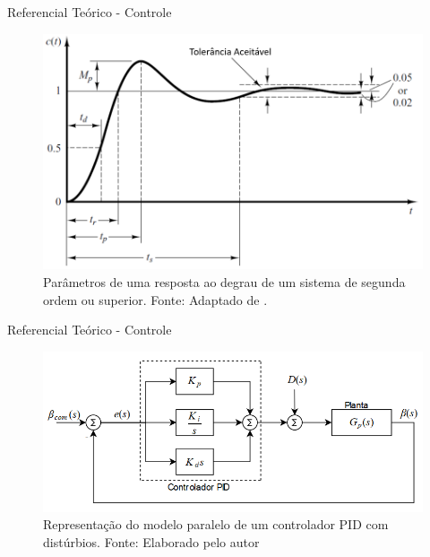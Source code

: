 \documentclass{beamer}
\begin{document}

\begin{frame}{Referencial Teórico - Controle}
    \begin{figure}[HT]
		\begin{center}
		\captionsetup{justification=centering}
        \includegraphics[scale=.35]{../referencial/img/transient_ogata_p170}
        \caption{Parâmetros de uma resposta ao degrau de um sistema de segunda ordem ou superior. \newline
        		 Fonte: Adaptado de .}
		\label{FIG_ADAPTATIVO}
        \end{center}
	\end{figure}
\end{frame}


\begin{frame}{Referencial Teórico - Controle}
    \begin{figure}[HT]
		\begin{center}
		\captionsetup{justification=centering}
        \includegraphics[scale=.45]{../referencial/img/pid_controller_Snider_p35}
        \caption{Representação do modelo paralelo de um controlador PID com distúrbios. \newline
        		 Fonte: Elaborado pelo autor}
		\label{FIG_ADAPTATIVO}
        \end{center}
	\end{figure}
\end{frame}
\end{document}
